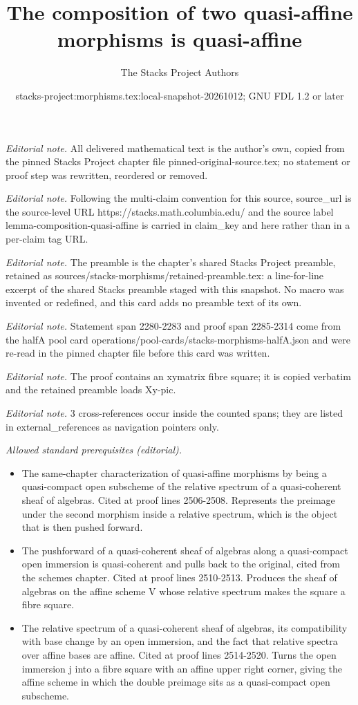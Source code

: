 \documentclass[10pt,a4paper]{amsart}
\title{The composition of two quasi-affine morphisms is quasi-affine}
\author{The Stacks Project Authors}
\date{stacks-project:morphisms.tex:local-snapshot-20261012; GNU FDL 1.2 or later}
\theoremstyle{plain}
\theoremstyle{definition}
\theoremstyle{remark}
\numberwithin{equation}{subsection}
\begin{document}
\maketitle
\noindent\textit{Editorial note.} All delivered mathematical text is the author's own, copied from the pinned Stacks Project chapter file pinned-original-source.tex; no statement or proof step was rewritten, reordered or removed.\par\medskip
\noindent\textit{Editorial note.} Following the multi-claim convention for this source, source\_url is the source-level URL https://stacks.math.columbia.edu/ and the source label lemma-composition-quasi-affine is carried in claim\_key and here rather than in a per-claim tag URL.\par\medskip
\noindent\textit{Editorial note.} The preamble is the chapter's shared Stacks Project preamble, retained as sources/stacks-morphisms/retained-preamble.tex: a line-for-line excerpt of the shared Stacks preamble staged with this snapshot. No macro was invented or redefined, and this card adds no preamble text of its own.\par\medskip
\noindent\textit{Editorial note.} Statement span 2280-2283 and proof span 2285-2314 come from the halfA pool card operations/pool-cards/stacks-morphisms-halfA.json and were re-read in the pinned chapter file before this card was written.\par\medskip
\noindent\textit{Editorial note.} The proof contains an xymatrix fibre square; it is copied verbatim and the retained preamble loads Xy-pic.\par\medskip
\noindent\textit{Editorial note.} 3 cross-references occur inside the counted spans; they are listed in external\_references as navigation pointers only.\par\medskip
\noindent\textit{Allowed standard prerequisites (editorial).}\begin{itemize}
\item The same-chapter characterization of quasi-affine morphisms by being a quasi-compact open subscheme of the relative spectrum of a quasi-coherent sheaf of algebras. Cited at proof lines 2506-2508. Represents the preimage under the second morphism inside a relative spectrum, which is the object that is then pushed forward.
\item The pushforward of a quasi-coherent sheaf of algebras along a quasi-compact open immersion is quasi-coherent and pulls back to the original, cited from the schemes chapter. Cited at proof lines 2510-2513. Produces the sheaf of algebras on the affine scheme V whose relative spectrum makes the square a fibre square.
\item The relative spectrum of a quasi-coherent sheaf of algebras, its compatibility with base change by an open immersion, and the fact that relative spectra over affine bases are affine. Cited at proof lines 2514-2520. Turns the open immersion j into a fibre square with an affine upper right corner, giving the affine scheme in which the double preimage sits as a quasi-compact open subscheme.
\end{itemize}\medskip
\end{document}
